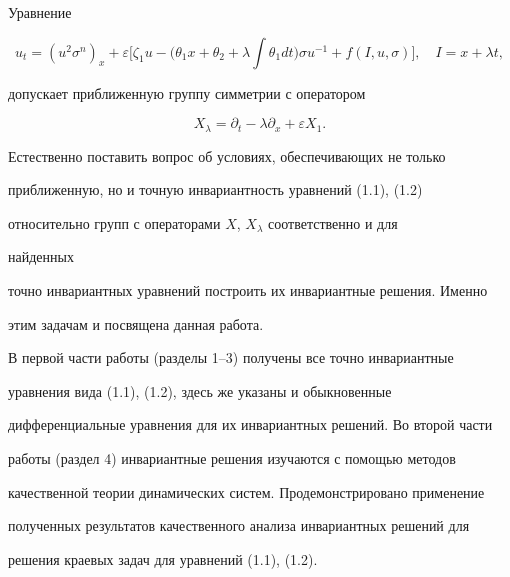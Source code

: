  


Уравнение 


\begin{equation} 


u_t=(u^2\sigma^n)_x+\varepsilon 


\bigg[\zeta_1u-\bigg(\theta_1x+\theta_2+\lambda\int 


\theta_1dt\bigg)\sigma u^{-1}+f(I,u,\sigma)\bigg],\quad 


I=x+\lambda t, \tag{1.2} 


\end{equation} 


допускает приближенную группу симметрии с оператором 


\begin{equation} 


X_\lambda=\partial_t-\lambda\partial_x+\varepsilon X_1. 


\tag{1.3} 


\end{equation} 


 


Естественно поставить вопрос об условиях, обеспечивающих не только 


приближенную, но и точную инвариантность уравнений (1.1), (1.2) 


относительно групп с операторами $X$, $X_\lambda$ соответственно и для 


найденных 


точно инвариантных уравнений построить их инвариантные решения. Именно 


этим задачам и посвящена данная работа. 


 


В первой части работы (разделы 1--3) получены все точно инвариантные 


уравнения вида (1.1), (1.2), здесь же указаны и обыкновенные 


дифференциальные уравнения для их инвариантных решений. Во второй части 


работы (раздел 4) инвариантные решения изучаются с помощью методов 


качественной теории динамических систем. Продемонстрировано применение 


полученных результатов качественного анализа инвариантных решений для 


решения краевых задач для уравнений (1.1), (1.2). 


